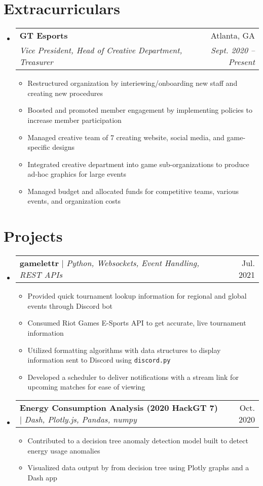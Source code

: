 \documentclass[a4paper,11pt]{extarticle}
\makeatletter
\newcommand{\resumeItem}[1]{
	\item\small{
		#1 \vspace{-1pt}
	}
}
\newcommand{\resumeProjectHeading}[3]{
	\vspace{-3pt}\item
		\begin{tabular*}{1\linewidth}{l@{\extracolsep{\fill}}r}
			\textbf{#1} $|$ \emph{#2} & #3 \\
		\end{tabular*}\vspace{-3pt}
}
\newcommand{\resumeSubheading}[4]{
	\vspace{-1pt}\item
		\begin{tabular*}{1\linewidth}{l@{\extracolsep{\fill}}r}
			\textbf{#1} & #2 \\
			\textit{#3} & \textit{#4} \\
		\end{tabular*}\vspace{-3pt}
}
\newcommand{\resumeSubHeadingListStart}{\begin{itemize}[leftmargin=0.15in,label={}]}
\newcommand{\resumeSubHeadingListEnd}{\end{itemize}}
\newcommand{\resumeItemListStart}{\begin{itemize}\vspace{-3pt}}
\newcommand{\resumeItemListEnd}{\end{itemize}\vspace{-3pt}}
\makeatother
\begin{document}
\section{Extracurriculars}
	\resumeSubHeadingListStart
        \resumeSubheading
            {GT Esports}
            {Atlanta, GA}
            {Vice President, Head of Creative Department, Treasurer}
            {Sept. 2020 -- Present}
        \resumeItemListStart
            \resumeItem{Restructured organization by interiewing/onboarding new
                staff and creating new procedures}
            \resumeItem{Boosted and promoted member engagement by implementing
                policies to increase member participation}
            \resumeItem{Managed creative team of 7 creating website, social
                media, and game-specific designs}
            \resumeItem{Integrated creative department into game sub-organizations
                to produce ad-hoc graphics for large events}
             \resumeItem{Managed budget and allocated funds for competitive teams, various events, and organization costs}
        \resumeItemListEnd
	\resumeSubHeadingListEnd

\section{Projects}
    \resumeSubHeadingListStart
      \vspace{1mm}
      \resumeProjectHeading
          {gamelettr}
          {Python, Websockets, Event Handling, REST APIs}
          {Jul. 2021}
        \resumeItemListStart
            \resumeItem{Provided quick tournament lookup information for
                regional and global events through Discord bot}
            \resumeItem{Consumed Riot Games E-Sports API to get accurate, live
                tournament information}
            \resumeItem{Utilized formatting algorithms with data structures to
                display information sent to Discord using \texttt{discord.py}}
            \resumeItem{
                Developed a scheduler to deliver notifications with a stream link for upcoming matches for ease of viewing
            }
        \resumeItemListEnd
        \resumeProjectHeading
        {Energy Consumption Analysis (2020 HackGT 7)}
        {Dash, Plotly.js, Pandas, numpy}
        {Oct. 2020}
        \resumeItemListStart
            \resumeItem{
                Contributed to a decision tree anomaly detection model
                built to detect energy usage anomalies
            }
            \resumeItem{
                Visualized data output by from decision tree using Plotly
                graphs and a Dash app
            }
        \resumeItemListEnd
    \resumeSubHeadingListEnd
\end{document}

